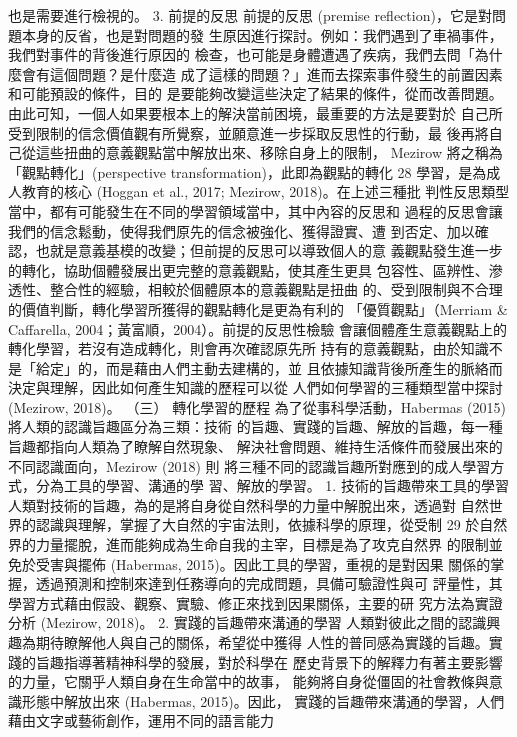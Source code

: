 也是需要進行檢視的。 
3. 前提的反思 
前提的反思 (premise reflection)，它是對問題本身的反省，也是對問題的發
生原因進行探討。例如：我們遇到了車禍事件，我們對事件的背後進行原因的
檢查，也可能是身體遭遇了疾病，我們去問「為什麼會有這個問題？是什麼造
成了這樣的問題？」進而去探索事件發生的前置因素和可能預設的條件，目的
是要能夠改變這些決定了結果的條件，從而改善問題。 
由此可知，一個人如果要根本上的解決當前困境，最重要的方法是要對於
自己所受到限制的信念價值觀有所覺察，並願意進一步採取反思性的行動，最
後再將自己從這些扭曲的意義觀點當中解放出來、移除自身上的限制，
Mezirow 將之稱為「觀點轉化」(perspective transformation)，此即為觀點的轉化
28 
學習，是為成人教育的核心 (Hoggan et al., 2017; Mezirow, 2018)。在上述三種批
判性反思類型當中，都有可能發生在不同的學習領域當中，其中內容的反思和
過程的反思會讓我們的信念鬆動，使得我們原先的信念被強化、獲得證實、遭
到否定、加以確認，也就是意義基模的改變；但前提的反思可以導致個人的意
義觀點發生進一步的轉化，協助個體發展出更完整的意義觀點，使其產生更具
包容性、區辨性、滲透性、整合性的經驗，相較於個體原本的意義觀點是扭曲
的、受到限制與不合理的價值判斷，轉化學習所獲得的觀點轉化是更為有利的
「優質觀點」（Merriam & Caffarella, 2004；黃富順，2004）。前提的反思性檢驗
會讓個體產生意義觀點上的轉化學習，若沒有造成轉化，則會再次確認原先所
持有的意義觀點，由於知識不是「給定」的，而是藉由人們主動去建構的，並
且依據知識背後所產生的脈絡而決定與理解，因此如何產生知識的歷程可以從
人們如何學習的三種類型當中探討 (Mezirow, 2018)。 
（三） 轉化學習的歷程 
為了從事科學活動，Habermas (2015) 將人類的認識旨趣區分為三類：技術
的旨趣、實踐的旨趣、解放的旨趣，每一種旨趣都指向人類為了瞭解自然現象、
解決社會問題、維持生活條件而發展出來的不同認識面向，Mezirow (2018) 則
將三種不同的認識旨趣所對應到的成人學習方式，分為工具的學習、溝通的學
習、解放的學習。 
1. 技術的旨趣帶來工具的學習 
人類對技術的旨趣，為的是將自身從自然科學的力量中解脫出來，透過對
自然世界的認識與理解，掌握了大自然的宇宙法則，依據科學的原理，從受制
29 
於自然界的力量擺脫，進而能夠成為生命自我的主宰，目標是為了攻克自然界
的限制並免於受害與擺佈 (Habermas, 2015)。因此工具的學習，重視的是對因果
關係的掌握，透過預測和控制來達到任務導向的完成問題，具備可驗證性與可
評量性，其學習方式藉由假設、觀察、實驗、修正來找到因果關係，主要的研
究方法為實證分析 (Mezirow, 2018)。 
2. 實踐的旨趣帶來溝通的學習 
人類對彼此之間的認識興趣為期待瞭解他人與自己的關係，希望從中獲得
人性的普同感為實踐的旨趣。實踐的旨趣指導著精神科學的發展，對於科學在
歷史背景下的解釋力有著主要影響的力量，它關乎人類自身在生命當中的故事，
能夠將自身從僵固的社會教條與意識形態中解放出來 (Habermas, 2015)。因此，
實踐的旨趣帶來溝通的學習，人們藉由文字或藝術創作，運用不同的語言能力
